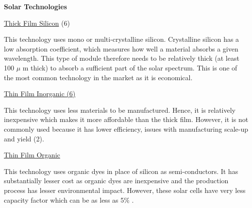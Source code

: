 \documentclass[12pt]{article}
\begin{document}
\vspace{\baselineskip}
\begin{justify}
\textbf{Solar Technologies}
\end{justify}\par


\vspace{\baselineskip}
\begin{justify}
\uline{Thick Film Silicon} (6)
\end{justify}\par

\begin{justify}
This technology uses mono or multi-crystalline silicon. Crystalline silicon has a low absorption coefficient, which measures how well a material absorbs a given wavelength. This type of module therefore needs to be relatively thick (at least 100 $ \mu $ m thick) to absorb a sufficient part of the solar spectrum. This is one of the most common technology in the market as it is economical.
\end{justify}\par


\vspace{\baselineskip}
\begin{justify}
\uline{Thin Film Inorganic (6)}
\end{justify}\par

\begin{justify}
This technology uses less materials to be manufactured. Hence, it is relatively inexpensive which makes it more affordable than the thick film. However, it is not commonly used because it has lower efficiency, issues with manufacturing scale-up and yield (2).
\end{justify}\par


\vspace{\baselineskip}
\begin{justify}
\uline{Thin Film Organic}
\end{justify}\par

\begin{justify}
This technology uses organic dyes in place of silicon as semi-conductors. It has substantially lesser cost as organic dyes are inexpensive and the production process has lesser environmental impact. However, these solar cells have very less capacity factor which can be as less as 5$\%$ .
\end{justify}\par
\end{document}
